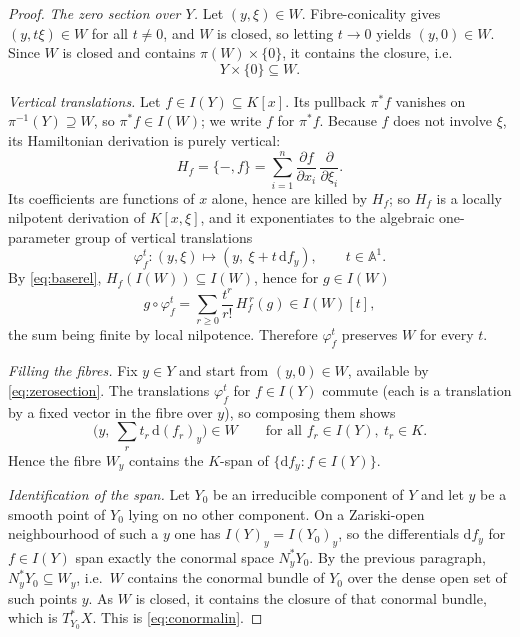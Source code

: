 \documentclass[11pt]{article}
\theoremstyle{plain}
\theoremstyle{definition}
\theoremstyle{remark}
\theoremstyle{plain}
\newcommand{\bbA}{\mathbb{A}}
\newcommand{\dd}{\mathrm{d}}
\begin{document}
\begin{proof}
\emph{The zero section over $Y$.} Let $(y,\xi)\in W$. Fibre-conicality gives
$(y,t\xi)\in W$ for all $t\neq0$, and $W$ is closed, so letting $t\to0$ yields
$(y,0)\in W$. Since $W$ is closed and contains $\pi(W)\times\{0\}$, it contains
the closure, i.e.
\begin{equation}\label{eq:zerosection}
  Y\times\{0\}\subseteq W .
\end{equation}

\emph{Vertical translations.} Let $f\in I(Y)\subseteq K[x]$. Its pullback
$\pi^*f$ vanishes on $\pi^{-1}(Y)\supseteq W$, so $\pi^*f\in I(W)$; we write
$f$ for $\pi^*f$. Because $f$ does not involve $\xi$, its Hamiltonian
derivation is purely vertical:
\[
  H_f=\{-,f\}=\sum_{i=1}^{n}\frac{\partial f}{\partial x_i}\,
     \frac{\partial}{\partial\xi_i}.
\]
Its coefficients are functions of $x$ alone, hence are killed by $H_f$; so
$H_f$ is a locally nilpotent derivation of $K[x,\xi]$, and it exponentiates to
the algebraic one-parameter group of vertical translations
\[
  \varphi^t_f\colon (y,\xi)\longmapsto (y,\ \xi+t\,\dd f_y),\qquad t\in\bbA^1 .
\]
By \eqref{eq:baserel}, $H_f(I(W))\subseteq I(W)$, hence for $g\in I(W)$
\[
  g\circ\varphi^t_f=\sum_{r\ge0}\frac{t^{r}}{r!}\,H_f^{\,r}(g)\in I(W)[t],
\]
the sum being finite by local nilpotence. Therefore $\varphi^t_f$ preserves
$W$ for every $t$.

\emph{Filling the fibres.} Fix $y\in Y$ and start from $(y,0)\in W$, available
by \eqref{eq:zerosection}. The translations $\varphi^{t}_{f}$ for $f\in I(Y)$
commute (each is a translation by a fixed vector in the fibre over $y$), so
composing them shows
\[
  \bigl(y,\ \textstyle\sum_{r}t_r\,\dd (f_r)_y\bigr)\in W
  \qquad\text{for all } f_r\in I(Y),\ t_r\in K .
\]
Hence the fibre $W_y$ contains the $K$-span of $\{\dd f_y: f\in I(Y)\}$.

\emph{Identification of the span.} Let $Y_0$ be an irreducible component of $Y$
and let $y$ be a smooth point of $Y_0$ lying on no other component. On a
Zariski-open neighbourhood of such a $y$ one has $I(Y)_y=I(Y_0)_y$, so the
differentials $\dd f_y$ for $f\in I(Y)$ span exactly the conormal space
$N^*_yY_0$. By the previous paragraph, $N^*_yY_0\subseteq W_y$, i.e.\ $W$
contains the conormal bundle of $Y_0$ over the dense open set of such points
$y$. As $W$ is closed, it contains the closure of that conormal bundle, which
is $T^*_{Y_0}X$. This is \eqref{eq:conormalin}.
\end{proof}
\end{document}
